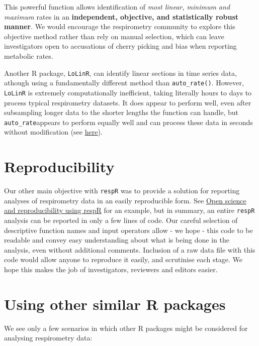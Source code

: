\documentclass[]{book}
\begin{document}
This powerful function allows identification of \emph{most linear,
minimum and maximum} rates in an \textbf{independent, objective, and
statistically robust manner}. We would encourage the respirometry
community to explore this objective method rather than rely on manual
selection, which can leave investigators open to accusations of cherry
picking and bias when reporting metabolic rates.

Another R package, \texttt{LoLinR}, can identify linear sections in time
series data, athough using a fundamentally different method than
\texttt{auto\_rate()}. However, \texttt{LoLinR} is extremely
computationally inefficient, taking literally hours to days to process
typical respirometry datasets. It does appear to perform well, even
after subsampling longer data to the shorter lengths the function can
handle, but \texttt{auto\_rate}appears to perform equally well and can
process these data in seconds without modification (see
\href{https://januarharianto.github.io/respR/articles/auto_rate_comp.html}{here}).

\section{Reproducibility}\label{reproducibility}

Our other main objective with \texttt{respR} was to provide a solution
for reporting analyses of respirometry data in an easily reproducible
form. See
\href{https://januarharianto.github.io/respR/articles/reproducibility.html}{Open
science and reproducibility using respR} for an example, but in summary,
an entire \texttt{respR} analysis can be reported in only a few lines of
code. Our careful selection of descriptive function names and input
operators allow - we hope - this code to be readable and convey easy
understanding about what is being done in the analysis, even without
additional comments. Inclusion of a raw data file with this code would
allow anyone to reproduce it easily, and scrutinise each stage. We hope
this makes the job of investigators, reviewers and editors easier.

\section{Using other similar R
packages}\label{using-other-similar-r-packages}

We see only a few scenarios in which other R packages might be
considered for analysing respirometry data:
\end{document}
